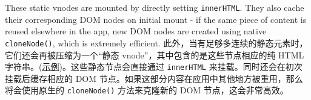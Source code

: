 \begin{paracol}{2}
These static vnodes are mounted by directly setting \texttt{innerHTML}.
They also cache their corresponding DOM nodes on initial mount - if the
same piece of content is reused elsewhere in the app, new DOM nodes are
created using native \texttt{cloneNode()}, which is extremely efficient.
\switchcolumn
此外，当有足够多连续的静态元素时，它们还会再被压缩为一个``静态
vnode''，其中包含的是这些节点相应的纯 HTML
字符串。(\href{https://template-explorer.vuejs.org/\#eyJzcmMiOiI8ZGl2PlxuICA8ZGl2IGNsYXNzPVwiZm9vXCI+Zm9vPC9kaXY+XG4gIDxkaXYgY2xhc3M9XCJmb29cIj5mb288L2Rpdj5cbiAgPGRpdiBjbGFzcz1cImZvb1wiPmZvbzwvZGl2PlxuICA8ZGl2IGNsYXNzPVwiZm9vXCI+Zm9vPC9kaXY+XG4gIDxkaXYgY2xhc3M9XCJmb29cIj5mb288L2Rpdj5cbiAgPGRpdj57eyBkeW5hbWljIH19PC9kaXY+XG48L2Rpdj4iLCJzc3IiOmZhbHNlLCJvcHRpb25zIjp7ImhvaXN0U3RhdGljIjp0cnVlfX0=}{示例})。这些静态节点会直接通过
\texttt{innerHTML} 来挂载。同时还会在初次挂载后缓存相应的 DOM
节点。如果这部分内容在应用中其他地方被重用，那么将会使用原生的
\texttt{cloneNode()} 方法来克隆新的 DOM 节点，这会非常高效。
\end{paracol}


